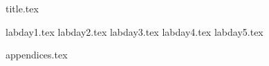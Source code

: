 \documentclass[final]{scrreprt} %
\begin{document}

{title.tex}

\newpage

\tableofcontents

\newpage
{}
{labday1.tex}
{labday2.tex}
{labday3.tex}
{labday4.tex}
{labday5.tex}
\newpage
{}

\printbibliography
{appendices.tex}
\end{document}
